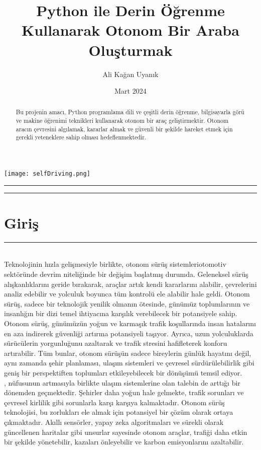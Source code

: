 \documentclass{article}
\title{Python ile Derin Öğrenme Kullanarak Otonom Bir Araba Oluşturmak}
\author{Ali Kağan Uyanık}
\date{Mart 2024}
\begin{document}
\begin{titlingpage}
    \maketitle
    \begin{center}
        \texttt{[image: selfDriving.png]} %
    \end{center}
    \vfill
    \rule{\textwidth}{0.5pt}
    \renewcommand{\abstractname}{Özet}
    \begin{abstract}
        \noindent Bu projenin amacı, Python programlama dili ve çeşitli derin öğrenme, bilgisayarla görü ve makine öğrenimi teknikleri kullanarak otonom bir araç geliştirmektir. Otonom aracın çevresini algılamak, kararlar almak ve güvenli bir şekilde hareket etmek için gerekli yeteneklere sahip olması hedeflenmektedir.
    \end{abstract}
    \rule{\textwidth}{0.5pt}
    \vfill
\end{titlingpage}
\newpage
\section{Giriş}
\rule{\textwidth}{0.5pt}\\[10pt]
Teknolojinin hızla gelişmesiyle birlikte, otonom sürüş sistemleri\cite{yiugit2020otonom}otomotiv sektöründe devrim niteliğinde bir değişim başlatmış durumda. Geleneksel sürüş alışkanlıklarını geride bırakarak, araçlar artık kendi kararlarını alabilir, çevrelerini analiz edebilir ve yolculuk boyunca tüm kontrolü ele alabilir hale geldi. Otonom sürüş, sadece bir teknolojik yenilik olmanın ötesinde, günümüz toplumlarının ve insanlığın bir dizi temel ihtiyacına karşılık verebilecek bir potansiyele sahip.\\[30pt]

\noindent Otonom sürüş, günümüzün yoğun ve karmaşık trafik koşullarında insan hatalarını en aza indirerek güvenliği artırma potansiyeli taşıyor. Ayrıca, uzun yolculuklarda sürücülerin yorgunluğunu azaltarak ve trafik stresini hafifleterek konforu artırabilir. Tüm bunlar, otonom sürüşün sadece bireylerin günlük hayatını değil, aynı zamanda şehir planlaması, ulaşım sistemleri ve çevresel sürdürülebilirlik gibi geniş bir perspektiften toplumları etkileyebilecek bir dönüşümü temsil ediyor.\\[30pt]

, nüfusunun artmasıyla birlikte ulaşım sistemlerine olan talebin de arttığı bir dönemden geçmektedir. Şehirler daha yoğun hale gelmekte, trafik sorunları ve çevresel kirlilik gibi sorunlarla karşı karşıya kalmaktadır. Otonom sürüş teknolojisi, bu zorlukları ele almak için potansiyel bir çözüm olarak ortaya çıkmaktadır. Akıllı sensörler, yapay zeka algoritmaları ve sürekli olarak güncellenen haritalar gibi unsurlar sayesinde otonom araçlar, trafiği daha etkin bir şekilde yönetebilir, kazaları önleyebilir ve karbon emisyonlarını azaltabilir.\cite{chai2021autonomous}\\[100pt]
\end{document}
